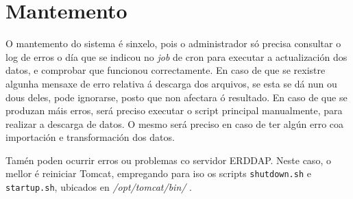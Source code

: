\section{Mantemento}\label{mantemento}
O mantemento do sistema é sinxelo, pois o administrador só precisa consultar o log de erros o día que se indicou no \textit{job} de cron para executar a actualización dos datos, e comprobar que
funcionou correctamente. En caso de que se rexistre algunha mensaxe de erro relativa á descarga dos arquivos, se esta se dá nun ou dous deles, pode ignorarse, posto que non afectara ó resultado. En
caso de que se produzan máis erros, será preciso executar o script principal manualmente, para realizar a descarga de datos. O mesmo será preciso en caso de ter algún erro coa importación e
transformación dos datos.

Tamén poden ocurrir erros ou problemas co servidor ERDDAP. Neste caso, o mellor é reiniciar Tomcat, empregando para iso os scripts \texttt{shutdown.sh} e \texttt{startup.sh}, ubicados en
\textit{/opt/tomcat/bin/} .